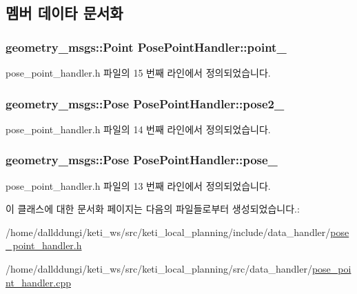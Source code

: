 \subsection{멤버 데이타 문서화}
\subsubsection[{\texorpdfstring{point\+\_\+}{point_}}]{\setlength{\rightskip}{0pt plus 5cm}geometry\+\_\+msgs\+::\+Point Pose\+Point\+Handler\+::point\+\_\+\hspace{0.3cm}{\ttfamily [private]}}\hypertarget{class_pose_point_handler_aa6dc915c1a9a98a64dd78c51f4b5ae02}{}\label{class_pose_point_handler_aa6dc915c1a9a98a64dd78c51f4b5ae02}


pose\+\_\+point\+\_\+handler.\+h 파일의 15 번째 라인에서 정의되었습니다.

\subsubsection[{\texorpdfstring{pose2\+\_\+}{pose2_}}]{\setlength{\rightskip}{0pt plus 5cm}geometry\+\_\+msgs\+::\+Pose Pose\+Point\+Handler\+::pose2\+\_\+\hspace{0.3cm}{\ttfamily [private]}}\hypertarget{class_pose_point_handler_ad615a2da1c3cd5cc3b5162390dac6136}{}\label{class_pose_point_handler_ad615a2da1c3cd5cc3b5162390dac6136}


pose\+\_\+point\+\_\+handler.\+h 파일의 14 번째 라인에서 정의되었습니다.

\subsubsection[{\texorpdfstring{pose\+\_\+}{pose_}}]{\setlength{\rightskip}{0pt plus 5cm}geometry\+\_\+msgs\+::\+Pose Pose\+Point\+Handler\+::pose\+\_\+\hspace{0.3cm}{\ttfamily [private]}}\hypertarget{class_pose_point_handler_ab78a62b6b03dee10487bf53339685a7d}{}\label{class_pose_point_handler_ab78a62b6b03dee10487bf53339685a7d}


pose\+\_\+point\+\_\+handler.\+h 파일의 13 번째 라인에서 정의되었습니다.



이 클래스에 대한 문서화 페이지는 다음의 파일들로부터 생성되었습니다.\+:\begin{DoxyCompactItemize}
\item 
/home/dallddungi/keti\+\_\+ws/src/keti\+\_\+local\+\_\+planning/include/data\+\_\+handler/\hyperlink{pose__point__handler_8h}{pose\+\_\+point\+\_\+handler.\+h}\item 
/home/dallddungi/keti\+\_\+ws/src/keti\+\_\+local\+\_\+planning/src/data\+\_\+handler/\hyperlink{pose__point__handler_8cpp}{pose\+\_\+point\+\_\+handler.\+cpp}\end{DoxyCompactItemize}
